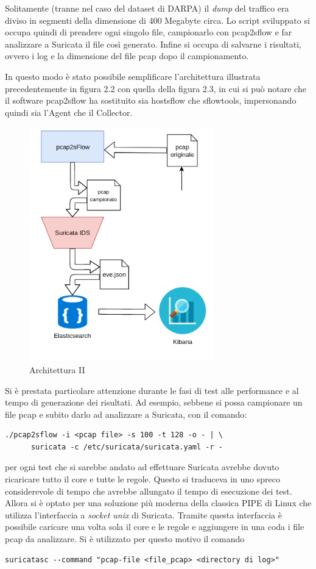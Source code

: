 \documentclass[12pt,a4paper,openright,twoside]{report}
\begin{document}
Solitamente (tranne nel caso del dataset di DARPA) il {\it dump} del traffico era
diviso in segmenti della dimensione di 400 Megabyte circa. Lo script sviluppato si
occupa quindi di prendere ogni singolo file, campionarlo con pcap2sflow e far analizzare
a Suricata il file cos\`i generato. Infine si occupa di salvarne i risultati, ovvero i log e la
dimensione del file pcap dopo il campionamento.

In questo modo \`e stato possibile semplificare l'architettura illustrata precedentemente
in figura 2.2 con quella della figura 2.3, in cui si pu\`o notare che il software
pcap2sflow ha sostituito sia hostsflow che sflowtools, impersonando quindi sia
l'Agent che il Collector.

\begin{figure}[h!]
  \begin{center}                          %
    \includegraphics[width=80mm]{images/arch-2.png}
    \caption{Architettura II}
    \label{}
  \end{center}
\end{figure}

Si \`e prestata particolare attenzione durante le fasi di test alle performance e
al tempo di generazione dei risultati. Ad esempio, sebbene si possa campionare un file
pcap e subito darlo ad analizzare a Suricata, con il comando:
\begin{verbatim}
./pcap2sflow -i <pcap file> -s 100 -t 128 -o - | \
      suricata -c /etc/suricata/suricata.yaml -r -
\end{verbatim}
per ogni test che si sarebbe andato ad effettuare Suricata avrebbe dovuto ricaricare
tutto il core e tutte le regole. Questo si traduceva in uno spreco considerevole di tempo
che avrebbe allungato il tempo di esecuzione dei test. Allora si \`e optato per una
soluzione pi\`u moderna della classica PIPE di Linux che utilizza l'interfaccia
a {\it socket unix} di Suricata. Tramite questa interfaccia \`e possibile caricare una
volta sola il core e le regole e aggiungere in una coda i file pcap da analizzare.
Si \`e utilizzato per questo motivo il comando
\begin{verbatim}
suricatasc --command "pcap-file <file_pcap> <directory di log>"
\end{verbatim}
\end{document}

